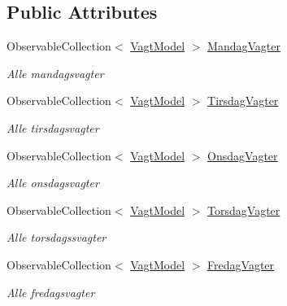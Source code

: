\subsection*{Public Attributes}
\begin{DoxyCompactItemize}
\item 
Observable\+Collection$<$ \hyperlink{class__1aarsproeve_1_1_model_1_1_vagt_model}{Vagt\+Model} $>$ \hyperlink{class__1aarsproeve_1_1_view_model_1_1_vagtplan_view_model_ab30a1a0a3f6f4a8346039429668d1889}{Mandag\+Vagter}
\begin{DoxyCompactList}\small\item\em Alle mandagsvagter \end{DoxyCompactList}\item 
Observable\+Collection$<$ \hyperlink{class__1aarsproeve_1_1_model_1_1_vagt_model}{Vagt\+Model} $>$ \hyperlink{class__1aarsproeve_1_1_view_model_1_1_vagtplan_view_model_a8265f827d1778bf509802e0cae97d23d}{Tirsdag\+Vagter}
\begin{DoxyCompactList}\small\item\em Alle tirsdagsvagter \end{DoxyCompactList}\item 
Observable\+Collection$<$ \hyperlink{class__1aarsproeve_1_1_model_1_1_vagt_model}{Vagt\+Model} $>$ \hyperlink{class__1aarsproeve_1_1_view_model_1_1_vagtplan_view_model_a057a5f18d529a68fcc48e6b53d90cd1e}{Onsdag\+Vagter}
\begin{DoxyCompactList}\small\item\em Alle onsdagsvagter \end{DoxyCompactList}\item 
Observable\+Collection$<$ \hyperlink{class__1aarsproeve_1_1_model_1_1_vagt_model}{Vagt\+Model} $>$ \hyperlink{class__1aarsproeve_1_1_view_model_1_1_vagtplan_view_model_a387f80d430c5277222c94374e811ac6a}{Torsdag\+Vagter}
\begin{DoxyCompactList}\small\item\em Alle torsdagssvagter \end{DoxyCompactList}\item 
Observable\+Collection$<$ \hyperlink{class__1aarsproeve_1_1_model_1_1_vagt_model}{Vagt\+Model} $>$ \hyperlink{class__1aarsproeve_1_1_view_model_1_1_vagtplan_view_model_a2b05730b9ea51ac617a49b54ef1ab380}{Fredag\+Vagter}
\begin{DoxyCompactList}\small\item\em Alle fredagsvagter \end{DoxyCompactList}\item 

\end{DoxyCompactItemize}
